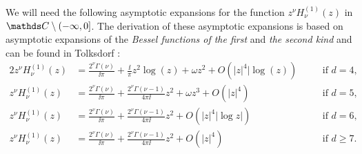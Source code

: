 We will need the following asymptotic expansions for the function $z^\nu H_\nu^{(1)}(z)$ in $\C \setminus (-\infty, 0]$.
The derivation of these asymptotic expansions is based on asymptotic expansions of the \emph{Bessel functions of the first} and \emph{the second kind} and can be found in Tolksdorf \cite[Sec. 4.2]{tolksdorf}:
\begin{alignat}{2}
  z^{\nu}H_\nu^{(1)}(z) &= \frac{2^\nu \Gamma(\nu)}{\ii \pi} + \frac{\ii}{\pi} z^2 \log(z) + \omega z^2 + O(|z|^4 |\log(z)) \quad&&\text{if } d = 4, \label{eq:asymptoticd4}\\
  z^{\nu} H_{\nu}^{(1)}(z) &= \frac{2^\nu \Gamma(\nu)}{\ii\pi} + \frac{2^\nu \Gamma(\nu - 1)}{4 \pi \ii} z^2 + \omega z^3 + O(|z|^4) &&\text{if } d = 5, \label{eq:asymptoticd5}\\
  z^\nu H_\nu^{(1)}(z) &= \frac{2^\nu \Gamma(\nu)}{\ii \pi} + \frac{2^\nu \Gamma(\nu - 1)}{4\pi \ii}z^2 + O(|z|^4 |\log z|) &&\text{if } d = 6,\label{eq:asymptoticd6} \\
  z^\nu H_\nu^{(1)}(z) &= \frac{2^\nu \Gamma(\nu)}{\ii \pi} + \frac{2^\nu \Gamma(\nu - 1)}{4 \pi \ii} z^2 + O(|z|^4) &&\text{if } d \geq 7.\label{eq:asymptoticd7}
\end{alignat}

